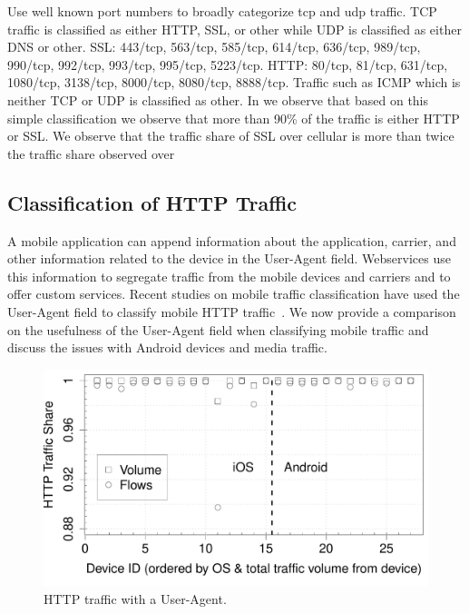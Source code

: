 Use well known port numbers to broadly categorize tcp and udp traffic. 
TCP traffic is classified as either HTTP, SSL, or other while UDP is classified as either DNS or other. 
SSL: 443/tcp, 563/tcp, 585/tcp, 614/tcp, 636/tcp, 989/tcp, 990/tcp, 992/tcp, 993/tcp, 995/tcp, 5223/tcp.
HTTP:  80/tcp, 81/tcp, 631/tcp, 1080/tcp, 3138/tcp, 8000/tcp, 8080/tcp, 8888/tcp.
Traffic such as ICMP which is neither TCP or UDP is classified as other. 
In  we observe that based on this simple classification we observe that more than 90\% of the traffic is either HTTP or SSL.
We observe that the traffic share of SSL over cellular is more than twice the traffic share observed over \wifi  

\subsection{Classification of HTTP Traffic}

A mobile application can append information about the application, carrier, and other information related to the device in the User-Agent field. 
Webservices use this information to segregate traffic from the mobile devices and carriers and to offer custom services.  
Recent studies on mobile traffic classification have used the User-Agent field to classify mobile HTTP traffic~\cite{qian:webcache, maier:mobtraffic, xu:appusage}.
We now provide a comparison on the usefulness of the User-Agent field when classifying mobile traffic and discuss the issues with Android devices and media traffic. 

\begin{figure}
\includegraphics[width=\columnwidth]{plots/appusage_someuseragent_traffic.pdf}
\caption{HTTP traffic with a User-Agent.}
\label{fig:http-classification-some-user-agent}
\end{figure}


